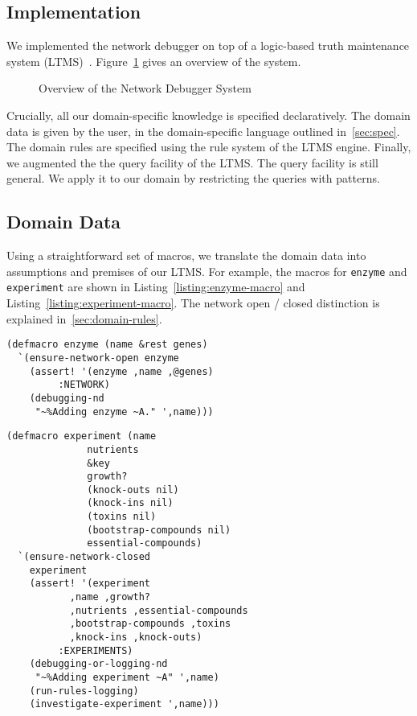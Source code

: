 \subsection{Implementation}

We implemented the network debugger on top of a logic-based truth maintenance system (LTMS)~\cite{bps93}.
Figure~\ref{figure:system} gives an overview of the system.

\begin{figure}[htb]
\centering
{}
\caption{\label{figure:system} Overview of the Network Debugger System}
\end{figure}

Crucially, all our domain-specific knowledge is specified
declaratively. The domain data is given by the user, in the
domain-specific language outlined in~\ref{sec:spec}. The domain rules
are specified using the rule system of the LTMS engine. Finally, we
augmented the the query facility of the LTMS. The query facility is
still general. We apply it to our domain by restricting the queries
with patterns.

\subsection{Domain Data}

Using a straightforward set of macros, we translate the domain data
into assumptions and premises of our LTMS. For example, the macros for
{\small\tt enzyme} and {\small\tt experiment} are shown in
Listing~\ref{listing:enzyme-macro} and
Listing~\ref{listing:experiment-macro}. The network open / closed
distinction is explained in~\ref{sec:domain-rules}.

\begin{lstlisting}[label={listing:enzyme-macro},caption={Enzyme Macro}]
(defmacro enzyme (name &rest genes)
  `(ensure-network-open enzyme
    (assert! '(enzyme ,name ,@genes)
	     :NETWORK)
    (debugging-nd
     "~%Adding enzyme ~A." ',name)))
\end{lstlisting}

\begin{lstlisting}[label={listing:experiment-macro},caption={Experiment Macro}]
(defmacro experiment (name 
		      nutrients
		      &key
		      growth?
		      (knock-outs nil)
		      (knock-ins nil)
		      (toxins nil)
		      (bootstrap-compounds nil)
		      essential-compounds)
  `(ensure-network-closed 
    experiment
    (assert! '(experiment 
	       ,name ,growth? 
	       ,nutrients ,essential-compounds
	       ,bootstrap-compounds ,toxins
	       ,knock-ins ,knock-outs)
	     :EXPERIMENTS)
    (debugging-or-logging-nd
     "~%Adding experiment ~A" ',name)
    (run-rules-logging)
    (investigate-experiment ',name)))
\end{lstlisting}

